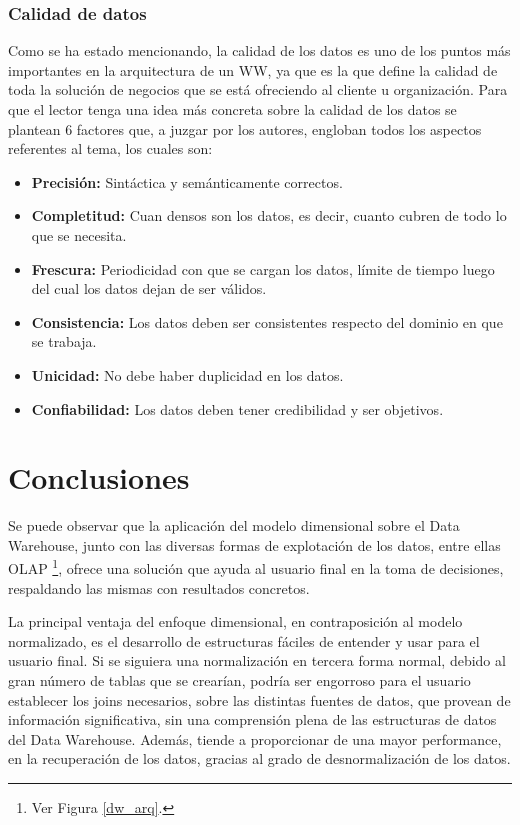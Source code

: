 \documentclass[a4paper,11pt]{article}
\begin{document}
    
    \subsubsection{Calidad de datos}
    
    Como se ha estado mencionando, la calidad de los datos es uno de los puntos más importantes en la arquitectura de un WW, ya que es la que define la calidad
    de toda la solución de negocios que se está ofreciendo al cliente u organización. Para que el lector tenga una idea más concreta sobre la calidad de los
    datos se plantean 6 factores que, a juzgar por los autores, engloban todos los aspectos referentes al tema, los cuales son:
    
    \begin{itemize}
      \item \textbf{Precisión:} Sintáctica y semánticamente correctos.
      \item \textbf{Completitud:} Cuan densos son los datos, es decir, cuanto cubren de todo lo que se necesita.
      \item \textbf{Frescura:} Periodicidad con que se cargan los datos, límite de tiempo luego del cual los datos dejan de ser válidos.
      \item \textbf{Consistencia:} Los datos deben ser consistentes respecto del dominio en que se trabaja.
      \item \textbf{Unicidad:} No debe haber duplicidad en los datos.
      \item \textbf{Confiabilidad:} Los datos deben tener credibilidad y ser objetivos.
    \end{itemize}
  
  

  \section{Conclusiones} \label{conclusiones}
  
  Se puede observar que la aplicación del modelo dimensional sobre el Data Warehouse, junto con las diversas formas de explotación de los datos, entre ellas
  OLAP \footnote{Ver Figura \ref{dw_arq}.}, ofrece una solución que ayuda al usuario final en la toma de decisiones, respaldando las mismas con resultados concretos.
  
  La principal ventaja del enfoque dimensional, en contraposición al modelo normalizado, es el desarrollo de estructuras fáciles de entender y usar para el
  usuario final. Si se siguiera una normalización en tercera forma normal, debido al gran número de tablas que se crearían, podría ser engorroso para el
  usuario establecer los joins necesarios, sobre las distintas fuentes de datos, que provean de información significativa, sin una comprensión plena
  de las estructuras de datos del Data Warehouse.
  Además, tiende a proporcionar de una mayor performance, en la recuperación de los datos, gracias al grado de desnormalización de los datos.
  
\end{document}
